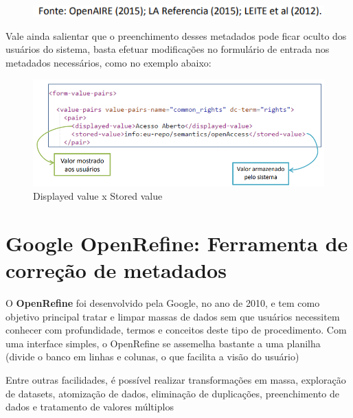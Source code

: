 \documentclass[12pt,hidelinks]{article}
\begin{document}
    \begin{figure}[!htp]
                \centering
                \includegraphics[scale=0.9]{figura/OpenAIRE(2015).png}
            \label{Rotulo}
        \end{figure}
        
\newpage
   
    Vale ainda salientar que o preenchimento desses metadados pode ficar oculto dos usuários do sistema, basta efetuar modificações no formulário de entrada nos metadados necessários, como no exemplo abaixo:
    
    \begin{figure}[!htp]
                \centering
                \includegraphics[scale=0.7]{figura/Figura183.png}
                \caption{Displayed value x Stored value}
            \label{Rotulo}
        \end{figure}

\newpage

\section{Google OpenRefine: Ferramenta de correção de metadados}

\newpage
    
    O \textbf{OpenRefine} foi desenvolvido pela Google, no ano de 2010, e tem como objetivo principal tratar e limpar massas de dados sem que usuários necessitem conhecer com profundidade, termos e conceitos deste tipo de procedimento. Com uma interface simples, o OpenRefine se assemelha bastante a uma planilha (divide o banco em linhas e colunas, o que facilita a visão do usuário)
    
    \singlespacing
    
    Entre outras facilidades, é possível realizar transformações em massa, exploração de datasets, atomização de dados, eliminação de duplicações, preenchimento de dados e tratamento de valores múltiplos
    
\end{document}
